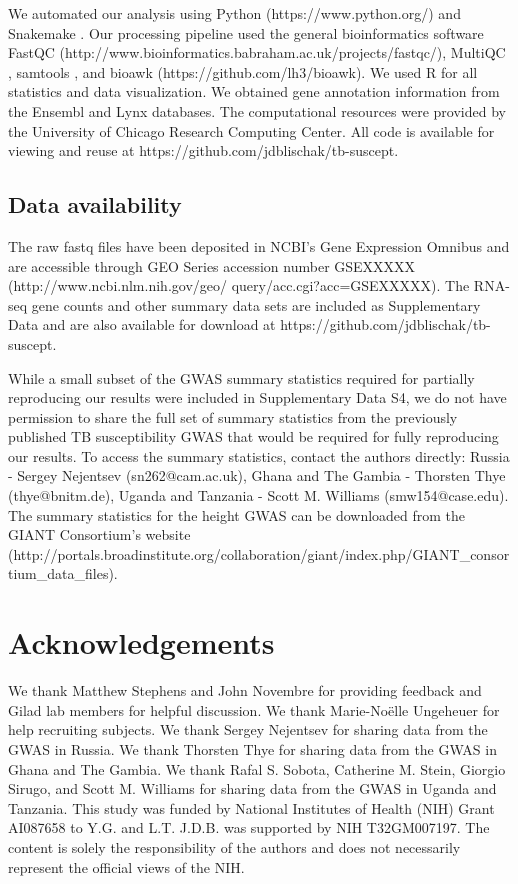 \documentclass[fleqn,10pt]{wlscirep}
\begin{document}
We automated our analysis using Python (https://www.python.org/) and
Snakemake \cite{Koster2012}. Our processing pipeline used the general
bioinformatics software FastQC
(http://www.bioinformatics.babraham.ac.uk/projects/fastqc/), MultiQC
\cite{Ewels2016}, samtools \cite{Li2009}, and bioawk
(https://github.com/lh3/bioawk). We used R \cite{R2015} for all
statistics and data visualization. We obtained gene annotation
information from the Ensembl \cite{Yates2016} and Lynx
\cite{Sulakhe2016} databases. The computational resources were
provided by the University of Chicago Research Computing Center. All
code is available for viewing and reuse at
https://github.com/jdblischak/tb-suscept.
\subsection*{Data availability}

The raw fastq files have been deposited in NCBI's Gene Expression
Omnibus \cite{Edgar2002} and are accessible through GEO Series
accession number GSEXXXXX (http://www.ncbi.nlm.nih.gov/geo/
query/acc.cgi?acc=GSEXXXXX). The RNA-seq gene counts and other summary
data sets are included as Supplementary Data and are also available
for download at https://github.com/jdblischak/tb-suscept.

While a small subset of the GWAS summary statistics required for
partially reproducing our results were included in Supplementary Data
S4, we do not have permission to share the full set of summary
statistics from the previously published TB susceptibility GWAS that
would be required for fully reproducing our results. To access the
summary statistics, contact the authors directly: Russia - Sergey
Nejentsev (sn262@cam.ac.uk), Ghana and The Gambia - Thorsten Thye
(thye@bnitm.de), Uganda and Tanzania - Scott M. Williams
(smw154@case.edu). The summary statistics for the height GWAS can be
downloaded from the GIANT Consortium’s website
(http://portals.broadinstitute.org/collaboration/giant/index.php/GIANT\_consortium\_data\_files).
\section*{Acknowledgements}

We thank Matthew Stephens and John Novembre for providing feedback and
Gilad lab members for helpful discussion. We thank Marie-Noëlle
Ungeheuer for help recruiting subjects. We thank Sergey Nejentsev for
sharing data from the GWAS in Russia. We thank Thorsten Thye for
sharing data from the GWAS in Ghana and The Gambia. We thank Rafal S.
Sobota, Catherine M. Stein, Giorgio Sirugo, and Scott M. Williams for
sharing data from the GWAS in Uganda and Tanzania. This study was
funded by National Institutes of Health (NIH) Grant AI087658 to Y.G.
and L.T. J.D.B. was supported by NIH T32GM007197. The content is
solely the responsibility of the authors and does not necessarily
represent the official views of the NIH.
\end{document}
